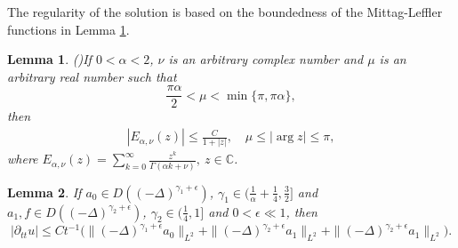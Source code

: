 \documentclass[11pt]{article}
\newtheorem{lemma}{Lemma}[section]
\numberwithin{equation}{section}
\begin{document}
The regularity of the solution is based on the boundedness of the Mittag-Leffler functions in Lemma \ref{lem-ml-asymp}.
\begin{lemma}(\cite{podlubny1998fract})\label{lem-ml-asymp}
If $0<\alpha<2$, $\nu$ is an arbitrary complex number and $\mu$ is an arbitrary real number such that
$$
  \frac{\pi\alpha}2 <\mu<\min\{\pi,\pi\alpha\},
$$
then
\begin{align*}
|E_{\alpha,\nu}(z)| \le \frac{C}{1+|z|} ,\quad  \mu\le |\arg z|\le\pi,
\end{align*}
where $E_{\alpha,\nu}(z) = \sum_{k=0}^{\infty} \frac{z^k}{\Gamma(\alpha k + \nu)}, ~ z \in \mathbb{C}$.
\end{lemma}

\iffalse
\begin{lemma}\label{thm-reg-maxi-2}
If $a_0\in D((-\Delta)^{\gamma_1+\epsilon})$, $\gamma_1\in(\frac{1}{\alpha}+\frac{1}{4},\frac32]$ and $a_1,f\in D((-\Delta)^{\gamma_2+\epsilon})$, $\gamma_2\in(\frac{1}{4},1]$ and $0<\epsilon \ll 1$, then
\[
|\partial _{tt}u| \leq Ct^{-1}\Big(\|(-\Delta)^{\gamma_1+\epsilon}a_0\|_{L^2}+\|(-\Delta)^{\gamma_2+\epsilon}a_1\|_{L^2}+\|(-\Delta)^{\gamma_2+\epsilon}a_1\|_{L^2}\Big).
\]
\end{lemma}
\end{document}
